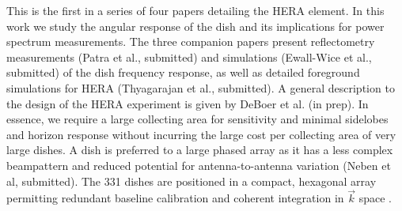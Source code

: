 \documentclass{emulateapj}
\begin{document}

This is the first in a series of four papers detailing the HERA element. In this work we study 
the angular response of the dish and its implications for power spectrum measurements. The three companion 
papers present reflectometry measurements (Patra et al., submitted) and simulations (Ewall-Wice et al., 
submitted) of the dish frequency response, as well as detailed 
foreground simulations for HERA (Thyagarajan et al., submitted). A general description to the design of the 
HERA experiment is given by DeBoer et al. (in prep). In essence, we 
require a large collecting area for
 sensitivity and minimal sidelobes and horizon response without incurring the large cost per collecting 
area of very large dishes. A dish is preferred to a large phased array as it has a less complex beampattern and reduced potential for antenna-to-antenna variation (Neben et al, submitted). The 331 dishes are positioned in a compact, hexagonal 
array permitting redundant baseline calibration and coherent integration in $
\vec{k}$ space \citep{omniscope,parsons12a}. 
\end{document}
